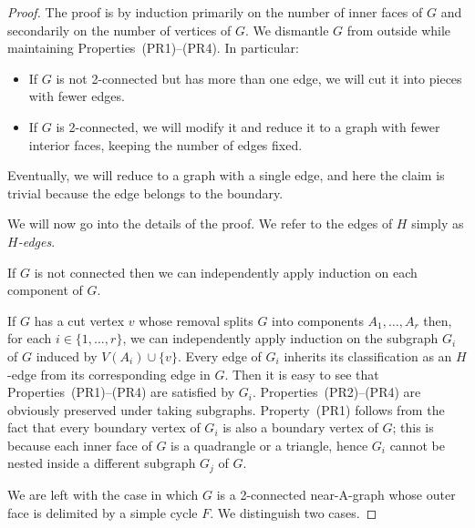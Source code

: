 \begin{proof}
	The proof is by induction primarily on the number of inner faces of $G$ and secondarily on the number of vertices of $G$. We dismantle $G$
	from outside while maintaining
	Properties~(PR1)--(PR4). In particular:
	\begin{itemize}
		\item If $G$ is not 2-connected but has more than one
                  edge, we will cut it
		into pieces with fewer edges.
		\item If $G$ is 2-connected, we will modify it and reduce it to a
		graph
		with fewer interior faces,
		keeping the number of edges fixed.
	\end{itemize}
Eventually, we will reduce to a graph with a single edge, and here the
claim is trivial because the edge belongs to the boundary.

We will now go into the details of the proof.
	We refer to the edges of $H$ simply as \emph{$H$-edges}.
	
	If $G$ is not connected then we can independently apply induction on each component
	of $G$. 
	
	If $G$ has a cut vertex $v$ whose removal
	splits $G$ into components $A_1,\ldots,A_r$ then, for each
	$i\in\{1,\ldots,r\}$, we can independently apply induction on the subgraph $G_i$ of $G$
	induced by $V(A_i)\cup\{v\}$. Every edge of $G_i$ inherits its
        classification as an $H$-edge from its corresponding edge in
        $G$.
        Then it is easy to see that Properties~(PR1)--(PR4) are
        satisfied by $G_i$.
        Properties~(PR2)--(PR4) are obviously preserved under taking subgraphs. 
        Property~(PR1) follows from the fact that every boundary vertex of $G_i$ is also a boundary vertex of $G$; this is because each inner face of $G$ is a quadrangle or a triangle, hence $G_i$ cannot be nested inside a different subgraph $G_j$ of $G$.

	\begin{figure*}[htb]
		\caption{Proof of  with a vertex
			$v$ on $Y$. Integrating a triangle into the outer face.}
	\end{figure*}	
        

	We are left with the case in which $G$ is a 2-connected near-A-graph whose outer face 
	is delimited by a simple cycle $F$. We distinguish two cases.
	

\end{proof}
